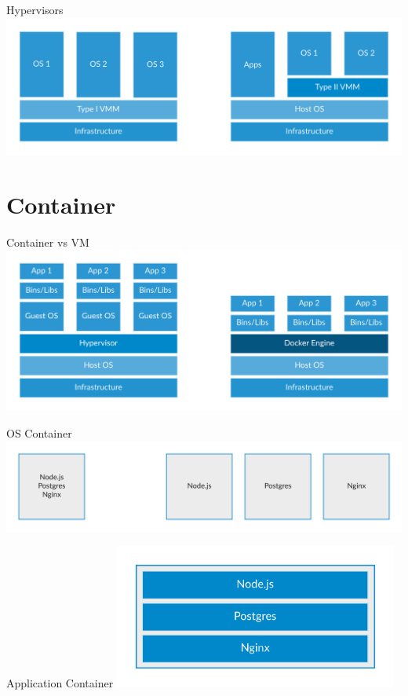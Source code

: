 \documentclass[10pt]{beamer}
\begin{document}
\begin{frame}{Hypervisors}
  \includegraphics[width=1\textwidth]{../images/2-hypervisors.png}
\end{frame}

\section{Container}

\begin{frame}{Container vs VM}
  \includegraphics[width=1\textwidth]{../images/6-container-vm.png}
\end{frame}

\begin{frame}{OS Container}
  \includegraphics[width=1\textwidth]{../images/4-os-specialized-containers.png}
\end{frame}

\begin{frame}{Application Container}
  \center
  \includegraphics[width=0.7\textwidth]{../images/5-application-container.png}
\end{frame}
\end{document}
